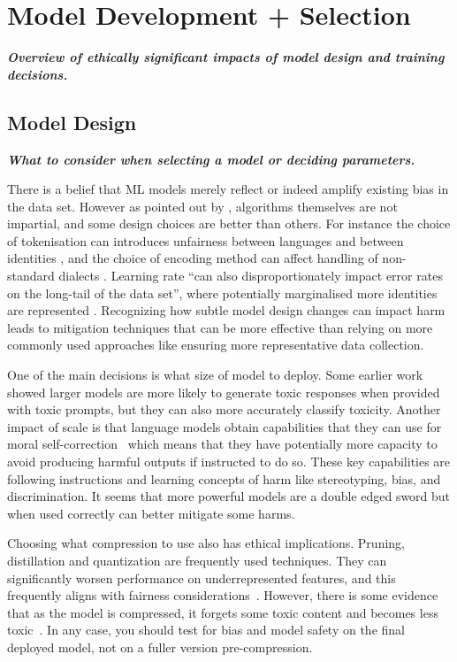 \section{Model Development + Selection}\label{sec:modeldev}
\noindent\textbf{\textit{Overview of ethically significant impacts of model design and training decisions.}}
\newline 

\subsection{Model Design}\label{subsec:design}\noindent\textbf{\textit{What to consider when selecting a model or deciding parameters.}}
\newline 

\noindent There is a belief that ML models merely reflect or indeed amplify existing bias in the data set. However as pointed out by \citet{hooker_moving_2021}, algorithms themselves are not impartial, and some design choices are better than others. For instance the choice of tokenisation can introduces unfairness between languages \cite{petrov_language_2023} and between identities \citep{ovalle_are_2023}, and the choice of encoding method can affect handling of non-standard dialects \cite{tan_mind_2020}. Learning rate ``can also disproportionately impact error rates on the long-tail of the data set'', where potentially marginalised more identities are represented \citep{hooker_moving_2021}. Recognizing how subtle model design changes can impact harm leads to mitigation techniques that can be more effective than relying on more commonly used approaches like ensuring more representative  data collection.

One of the main decisions is what size of model to deploy. 
Some earlier work \citep{rae_scaling_2021} showed larger models are more likely to generate toxic responses when provided
with toxic prompts, but they can also more accurately classify toxicity. Another impact of scale is that language models obtain capabilities that they can use for moral self-correction~\cite{ganguli_capacity_2023, schick_self-diagnosis_2021} which means that they have potentially more capacity to avoid producing harmful outputs if instructed to do so. These key capabilities are following instructions and learning concepts of harm like stereotyping, bias, and discrimination. It seems that more powerful models are a double edged sword but when used correctly can better mitigate some harms. 

Choosing what compression to use also has ethical implications. Pruning, distillation and quantization are frequently used techniques. They can significantly worsen performance on underrepresented features, and this frequently aligns with fairness considerations~\citep{ramesh_comparative_2023, hooker_characterising_2020}. However,
there is some evidence that as the model is compressed, it forgets
some toxic content and becomes less
toxic~\cite{xu_can_2022}. In any case, you should test for bias and model safety on the final deployed model, not on a fuller version pre-compression. 

